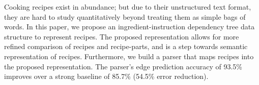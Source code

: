 Cooking recipes exist in abundance; but due to their unstructured text format, they are hard to study quantitatively beyond treating them as simple bags of words. In this paper, we propose an ingredient-instruction dependency tree data structure to represent recipes.   The proposed representation allows for more refined comparison of recipes and recipe-parts, and is a step towards semantic representation of recipes. Furthermore, we build a parser that maps  recipes into the proposed representation. The parser's edge prediction accuracy of 93.5\% improves over a strong baseline of 85.7\% (54.5\% error reduction).
